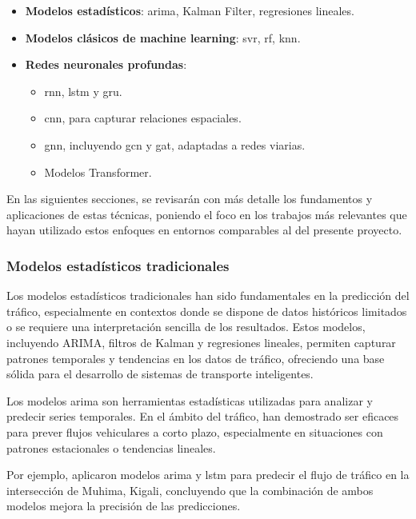 \begin{itemize}
	\item \textbf{Modelos estadísticos}: \acrlong{arima}, Kalman Filter, regresiones lineales.
	\item \textbf{Modelos clásicos de machine learning}: \acrlong{svr}, \acrlong{rf}, \acrlong{knn}.
	\item \textbf{Redes neuronales profundas}:
	\begin{itemize}
		\item \acrlong{rnn}, \acrlong{lstm} y \acrlong{gru}.
		\item \acrlong{cnn}, para capturar relaciones espaciales.
		\item \acrlong{gnn}, incluyendo \acrlong{gcn} y \acrlong{gat}, adaptadas a redes viarias.
		\item Modelos Transformer.
	\end{itemize}
\end{itemize}

En las siguientes secciones, se revisarán con más detalle los fundamentos y aplicaciones de estas técnicas, poniendo el foco en los trabajos más relevantes que hayan utilizado estos enfoques en entornos comparables al del presente proyecto.

\subsubsection{Modelos estadísticos tradicionales}

Los modelos estadísticos tradicionales han sido fundamentales en la predicción del tráfico, especialmente en contextos donde se dispone de datos históricos limitados o se requiere una interpretación sencilla de los resultados. Estos modelos, incluyendo ARIMA, filtros de Kalman y regresiones lineales, permiten capturar patrones temporales y tendencias en los datos de tráfico, ofreciendo una base sólida para el desarrollo de sistemas de transporte inteligentes.

Los modelos \acrlong{arima} son herramientas estadísticas utilizadas para analizar y predecir series temporales. En el ámbito del tráfico, han demostrado ser eficaces para prever flujos vehiculares a corto plazo, especialmente en situaciones con patrones estacionales o tendencias lineales.

Por ejemplo, \cite{forecastArimaLtsm} aplicaron modelos \acrshort{arima} y \acrshort{lstm} para predecir el flujo de tráfico en la intersección de Muhima, Kigali, concluyendo que la combinación de ambos modelos mejora la precisión de las predicciones.

